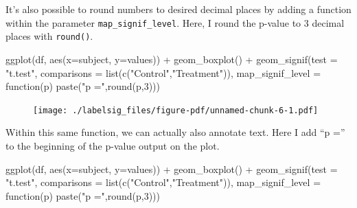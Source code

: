 \documentclass[
  letterpaper,
  DIV=11,
  numbers=noendperiod]{scrreprt}
\newenvironment{Shaded}{\begin{snugshade}}{\end{snugshade}}
\newcommand{\AttributeTok}[1]{\textcolor[rgb]{0.40,0.45,0.13}{#1}}
\newcommand{\ControlFlowTok}[1]{\textcolor[rgb]{0.00,0.23,0.31}{#1}}
\newcommand{\DecValTok}[1]{\textcolor[rgb]{0.68,0.00,0.00}{#1}}
\newcommand{\FunctionTok}[1]{\textcolor[rgb]{0.28,0.35,0.67}{#1}}
\newcommand{\NormalTok}[1]{\textcolor[rgb]{0.00,0.23,0.31}{#1}}
\newcommand{\SpecialCharTok}[1]{\textcolor[rgb]{0.37,0.37,0.37}{#1}}
\newcommand{\StringTok}[1]{\textcolor[rgb]{0.13,0.47,0.30}{#1}}
\begin{document}
It's also possible to round numbers to desired decimal places by adding
a function within the parameter \texttt{map\_signif\_level}. Here, I
round the p-value to 3 decimal places with \texttt{round()}.

\begin{Shaded}
\begin{Highlighting}[]
\FunctionTok{ggplot}\NormalTok{(df, }\FunctionTok{aes}\NormalTok{(}\AttributeTok{x=}\NormalTok{subject, }\AttributeTok{y=}\NormalTok{values)) }\SpecialCharTok{+}
  \FunctionTok{geom\_boxplot}\NormalTok{() }\SpecialCharTok{+}
  \FunctionTok{geom\_signif}\NormalTok{(}\AttributeTok{test =} \StringTok{"t.test"}\NormalTok{, }
              \AttributeTok{comparisons =} \FunctionTok{list}\NormalTok{(}\FunctionTok{c}\NormalTok{(}\StringTok{"Control"}\NormalTok{,}\StringTok{"Treatment"}\NormalTok{)),}
              \AttributeTok{map\_signif\_level =} \ControlFlowTok{function}\NormalTok{(p) }\FunctionTok{paste}\NormalTok{(}\StringTok{"p ="}\NormalTok{,}\FunctionTok{round}\NormalTok{(p,}\DecValTok{3}\NormalTok{)))}
\end{Highlighting}
\end{Shaded}

\begin{figure}[H]

{\centering \texttt{[image: ./labelsig\_files/figure-pdf/unnamed-chunk-6-1.pdf]}

}

\end{figure}

Within this same function, we can actually also annotate text. Here I
add ``p ='' to the beginning of the p-value output on the plot.

\begin{Shaded}
\begin{Highlighting}[]
\FunctionTok{ggplot}\NormalTok{(df, }\FunctionTok{aes}\NormalTok{(}\AttributeTok{x=}\NormalTok{subject, }\AttributeTok{y=}\NormalTok{values)) }\SpecialCharTok{+}
  \FunctionTok{geom\_boxplot}\NormalTok{() }\SpecialCharTok{+}
  \FunctionTok{geom\_signif}\NormalTok{(}\AttributeTok{test =} \StringTok{"t.test"}\NormalTok{, }
              \AttributeTok{comparisons =} \FunctionTok{list}\NormalTok{(}\FunctionTok{c}\NormalTok{(}\StringTok{"Control"}\NormalTok{,}\StringTok{"Treatment"}\NormalTok{)),}
              \AttributeTok{map\_signif\_level =} \ControlFlowTok{function}\NormalTok{(p) }\FunctionTok{paste}\NormalTok{(}\StringTok{"p ="}\NormalTok{,}\FunctionTok{round}\NormalTok{(p,}\DecValTok{3}\NormalTok{)))}
\end{Highlighting}
\end{Shaded}
\end{document}
